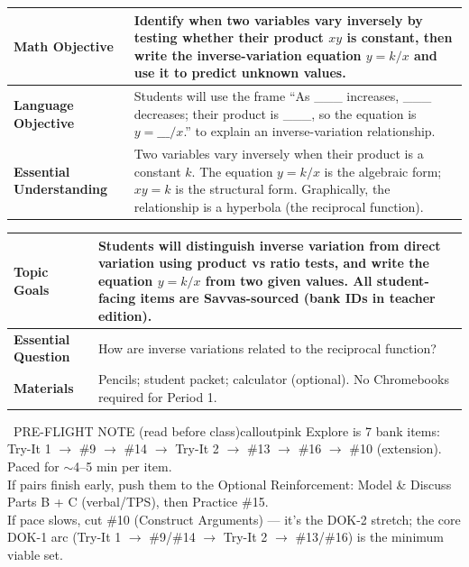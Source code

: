 \documentclass[11pt]{article}
\begin{document}

{\small
\renewcommand{\arraystretch}{1.25}
\noindent\begin{tabular}{|p{1.8in}|p{4.8in}|}
\hline
\textbf{Math Objective} & Identify when two variables vary inversely by testing whether their product \(xy\) is constant, then write the inverse-variation equation \(y = k/x\) and use it to predict unknown values. \\ \hline
\textbf{Language Objective} & Students will use the frame ``As \_\_\_ increases, \_\_\_ decreases; their product is \_\_\_, so the equation is \(y = \_\_\_/x\).'' to explain an inverse-variation relationship. \\ \hline
\textbf{Essential Understanding} & Two variables vary inversely when their product is a constant \(k\). The equation \(y = k/x\) is the algebraic form; \(xy = k\) is the structural form. Graphically, the relationship is a hyperbola (the reciprocal function). \\ \hline
\end{tabular}
}

{\small
\renewcommand{\arraystretch}{1.25}
\noindent\begin{tabular}{|p{1.8in}|p{4.8in}|}
\hline
\textbf{Topic Goals} & Students will distinguish inverse variation from direct variation using product vs ratio tests, and write the equation \(y = k/x\) from two given values. All student-facing items are Savvas-sourced (bank IDs in teacher edition). \\ \hline
\textbf{Essential Question} & How are inverse variations related to the reciprocal function? \\ \hline
\textbf{Materials} & Pencils; student packet; calculator (optional). No Chromebooks required for Period 1. \\ \hline
\end{tabular}
}

\begin{callout}{\IconPin\ PRE-FLIGHT NOTE (read before class)}{calloutpink}
Explore is 7 bank items: Try-It 1 \(\rightarrow\) \#9 \(\rightarrow\) \#14 \(\rightarrow\) Try-It 2 \(\rightarrow\) \#13 \(\rightarrow\) \#16 \(\rightarrow\) \#10 (extension). Paced for \(\sim\)4--5 min per item.\\
If pairs finish early, push them to the Optional Reinforcement: Model \& Discuss Parts B + C (verbal/TPS), then Practice \#15.\\
If pace slows, cut \#10 (Construct Arguments) --- it's the DOK-2 stretch; the core DOK-1 arc (Try-It 1 \(\rightarrow\) \#9/\#14 \(\rightarrow\) Try-It 2 \(\rightarrow\) \#13/\#16) is the minimum viable set.
\end{callout}
\end{document}
